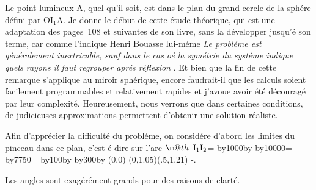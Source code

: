 \documentclass[11pt,frenchb,BCOR10mm,DIV12,bibliography=totoc,parskip=false,smallheadings
    headexclude,footexclude,oneside]{pst-doc}
\makeatletter
\def\ARC#1{\setbox0\hbox{$\m@th\displaystyle#1$}\kslant=\ht0
   \divide\kslant by1000\multiply\kslant by\fontdimen1\textfont1
   \divide\kslant by10000\kslantd=\kslant\fontdimen6\textfont1
      \divide\kslantd by7750\kern\kslantd
   \r@ppord=\wd0\multiply\r@ppord by100\divide\r@ppord by\ht0
   \multiply\r@ppord by300\advance\r@ppord by\ht0
   \pspicture(0,0)
   \psparabola[linewidth=.3pt](0,1.05\ht0)(.5\wd0,1.21\r@ppord)
   \endpspicture\kern-\kslantd\box0}
\makeatother
\begin{document}
Le point lumineux A, quel qu'il soit, est dans le plan du grand
cercle de la sphére défini par $\mathrm{OI_1A}$. Je donne le début
de cette étude théorique, qui est une adaptation des pages~108 et suivantes de son livre,
sans la développer jusqu'é son terme, car
comme l'indique Henri Bouasse lui-méme \guillemotleft \textit{ Le
probléme est généralement inextricable, sauf dans le cas oé la
symétrie du systéme indique quels rayons il faut regrouper aprés
réflexion} \guillemotright. Et bien que la fin de cette remarque
s'applique au miroir sphérique, encore faudrait-il que les calculs
soient facilement programmables et relativement rapides et j'avoue
avoir été découragé par leur complexité. Heureusement, nous
verrons que dans certaines conditions, de judicieuses
approximations permettent d'obtenir une solution réaliste.

Afin d'apprécier la difficulté du probléme, on considére d'abord les limites du pinceau 
dans ce plan, c'est é dire sur l'arc  \ARC{\mathrm{\hspace{0.5em}I_1I_2}}.

Les angles sont exagérément grands
pour des raisons de clarté.
\end{document}
